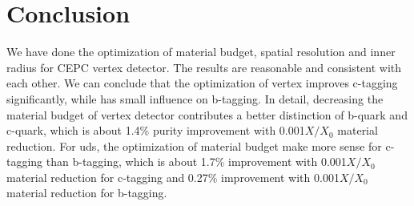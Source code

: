 \documentclass[usetikz]{style/cepcnote}
\begin{document}
\section{Conclusion}

We have done the optimization of material budget, spatial resolution and inner radius for CEPC vertex detector. 
The results are reasonable and consistent with each other. 
We can conclude that the optimization of vertex improves c-tagging significantly, while has small influence on b-tagging. 
In detail, decreasing the material budget of vertex detector contributes a better distinction of b-quark and c-quark,
which is about 1.4\% purity improvement with 0.001$X/X_0$ material reduction. 
For uds, the optimization of material budget make more sense for c-tagging than b-tagging, 
which is about 1.7\% improvement with 0.001$X/X_0$ material reduction for c-tagging and 0.27\% improvement with 0.001$X/X_0$ material reduction for b-tagging.
\end{document}
